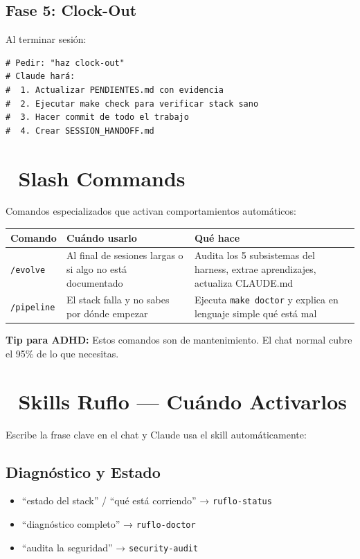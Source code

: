 \documentclass[11pt,a4paper,spanish]{article}
\begin{document}
\subsection*{Fase 5: Clock-Out}
Al terminar sesión:
\begin{lstlisting}
# Pedir: "haz clock-out"
# Claude hará:
#  1. Actualizar PENDIENTES.md con evidencia
#  2. Ejecutar make check para verificar stack sano
#  3. Hacer commit de todo el trabajo
#  4. Crear SESSION_HANDOFF.md
\end{lstlisting}

\vspace{0.5cm}

\section{🎯 Slash Commands}

Comandos especializados que activan comportamientos automáticos:

\vspace{0.3cm}

\begin{tabular}{|p{2cm}|p{3cm}|p{4cm}|}
\hline
\textbf{Comando} & \textbf{Cuándo usarlo} & \textbf{Qué hace} \\
\hline
\texttt{/evolve} & Al final de sesiones largas o si algo no está documentado & Audita los 5 subsistemas del harness, extrae aprendizajes, actualiza CLAUDE.md \\
\texttt{/pipeline} & El stack falla y no sabes por dónde empezar & Ejecuta \texttt{make doctor} y explica en lenguaje simple qué está mal \\
\hline
\end{tabular}

\vspace{0.3cm}

\noindent\textbf{Tip para ADHD:} Estos comandos son de mantenimiento. El chat normal cubre el 95\% de lo que necesitas.

\section{🔧 Skills Ruflo — Cuándo Activarlos}

Escribe la frase clave en el chat y Claude usa el skill automáticamente:

\subsection*{Diagnóstico y Estado}
\begin{itemize}
  \item ``estado del stack'' / ``qué está corriendo'' → \texttt{ruflo-status}
  \item ``diagnóstico completo'' → \texttt{ruflo-doctor}
  \item ``audita la seguridad'' → \texttt{security-audit}
\end{itemize}
\end{document}
